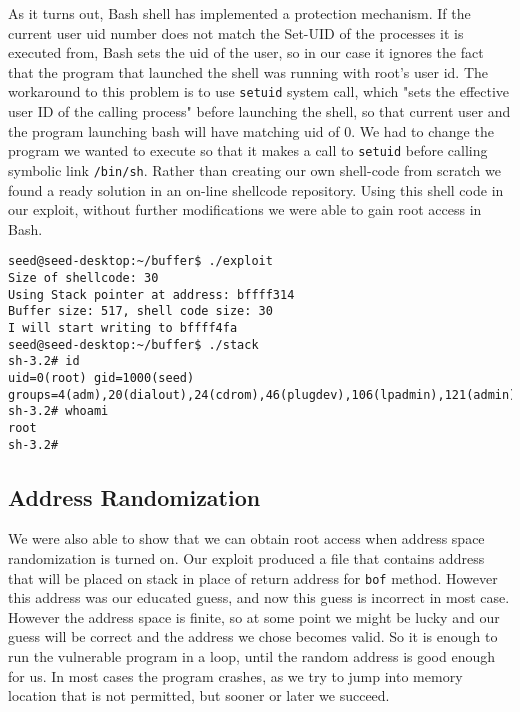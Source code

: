 \documentclass[12pt, a4paper, pdflatex]{article}
\begin{document}
As it turns out, Bash shell has implemented a protection mechanism. If the current user uid number does not match the Set-UID of the processes it is executed from, Bash sets the uid of the user, so in our case it ignores the fact that the program that launched the shell was running with root's user id. The workaround to this problem is to use \texttt{setuid} system call, which "sets the effective user ID of the calling process"\cite{setuidman} before launching the shell, so that current user and the program launching bash will have matching uid of 0. We had to change the program we wanted to execute so that it makes a call to \texttt{setuid} before calling symbolic link \texttt{/bin/sh}. Rather than creating our own shell-code from scratch we found a ready solution in an on-line shellcode repository\cite{shellstorm}. Using this shell code in our exploit, without further modifications we were able to gain root access in Bash.

\vspace{1em}
\lstset{
	captionpos=b,
	frame=single,
	language=BASH,
	breaklines=true,
	caption=Function with buffer overflow vulnerability,
	label=bof:root2,
}
\begin{lstlisting}
seed@seed-desktop:~/buffer$ ./exploit 
Size of shellcode: 30
Using Stack pointer at address: bffff314
Buffer size: 517, shell code size: 30
I will start writing to bffff4fa
seed@seed-desktop:~/buffer$ ./stack 
sh-3.2# id
uid=0(root) gid=1000(seed) groups=4(adm),20(dialout),24(cdrom),46(plugdev),106(lpadmin),121(admin),122(sambashare),1000(seed)
sh-3.2# whoami
root
sh-3.2# 
\end{lstlisting}

\subsection{Address Randomization}

We were also able to show that we can obtain root access when address space randomization is turned on. Our exploit produced a file that contains address that will be placed on stack in place of return address for \texttt{bof} method. However this address was our educated guess, and now this guess is incorrect in most case. However the address space is finite, so at some point we might be lucky and our guess will be correct and the address we chose becomes valid. So it is enough to run the vulnerable program in a loop, until the random address is good enough for us. In most cases the program crashes, as we try to jump into memory location that is not permitted, but sooner or later we succeed.
\end{document}
